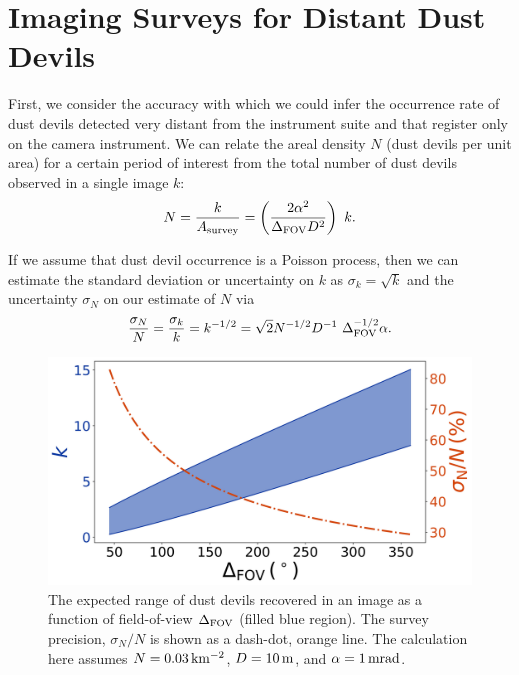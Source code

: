 \documentclass{aastex63}
\begin{document}
\section{Imaging Surveys for Distant Dust Devils}
First, we consider the accuracy with which we could infer the occurrence rate of dust devils detected very distant from the instrument suite and that register only on the camera instrument. We can relate the areal density $N$ (dust devils per unit area) for a certain period of interest from the total number of dust devils observed in a single image $k$:
\begin{equation}
   N = \frac{k}{A_{\rm survey}} = \left( \frac{2 \alpha^2}{\Delta_{\rm FOV} D^2} \right)\ k.
    \label{eqn:areal_occurrence}
\end{equation}

If we assume that dust devil occurrence is a Poisson process, then we can estimate the standard deviation or uncertainty on $k$ as $\sigma_k = \sqrt{k}$ and the uncertainty $\sigma_N$ on our estimate of $N$ via
\begin{equation}
    \frac{\sigma_N}{N} = \frac{\sigma_k}{k} = k^{-1/2} = \sqrt{2} N^{-1/2} D^{-1}\ \Delta_{\rm FOV}^{-1/2} \alpha.
    \label{eqn:sigma_N}
\end{equation}

\begin{figure}
    \centering
    \includegraphics[width=\textwidth]{figures/DDs_vs_Delta.jpg}
    \caption{The expected range of dust devils recovered in an image as a function of field-of-view $\Delta_{\rm FOV}$ (filled blue region). The survey precision, $\sigma_N/N$ is shown as a dash-dot, orange line. The calculation here assumes $N = 0.03\,{\rm km^{-2}}$, $D = 10\,{\rm m}$, and $\alpha = 1\,{\rm mrad}$.}
    \label{fig:DDs_vs_Delta}
\end{figure}
\end{document}

